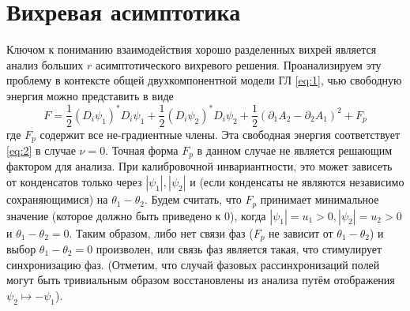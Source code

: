 \section{Вихревая асимптотика}

Ключом к пониманию взаимодействия хорошо разделенных вихрей является анализ  
больших \( r \) асимптотического вихревого решения. Проанализируем эту 
проблему в контексте общей двухкомпонентной модели ГЛ \eqref{eq:1}, чью 
свободную энергия можно представить в виде
\begin{equation}
    F = \frac{1}{2}\left( D_i \psi_1 \right)^{*} D_i \psi_1 + 
        \frac{1}{2}\left( D_i \psi_2 \right)^{*} D_i \psi_2 + 
        \frac{1}{2}\left( \partial_1 A_2 - \partial_2 A_1 \right)^2 + F_p
    \label{eq:3}
\end{equation}
где \( F_p \) содержит все не-градиентные члены. Эта свободная энергия 
соответствует \eqref{eq:2} в случае \( \nu = 0 \). Точная форма \( F_p \) в 
данном случае не является решающим фактором для анализа. При калибровочной 
инвариантности, это может зависеть от конденсатов только через 
\( |\psi_1|, |\psi_2| \) и (если конденсаты не являются независимо 
сохраняющимися) на \( \theta_1 - \theta_2 \). Будем считать, что \( F_p \) 
принимает минимальное значение (которое должно быть приведено к 0), когда 
\( |\psi_1| = u_1 > 0, |\psi_2| = u_2 > 0 \) и \( \theta_1 - \theta_2 = 0 \).
Таким образом, либо нет связи фаз (\( F_p \) не зависит от 
\( \theta_1 - \theta_2 \)) и выбор \( \theta_1 - \theta_2 = 0 \) произволен, 
или связь фаз является такая, что стимулирует синхронизацию фаз. (Отметим, 
что случай фазовых рассинхронизаций полей могут быть тривиальным образом 
восстановлены из анализа путём отображения \( \psi_2 \mapsto -\psi_1 \)).


